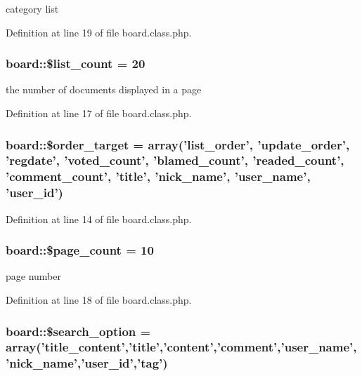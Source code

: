 category list 



Definition at line 19 of file board.\-class.\-php.

\hypertarget{classboard_ab66c6932a082c110ebd921c0be8d6788}{
\subsubsection[{\$list\-\_\-count}]{\setlength{\rightskip}{0pt plus 5cm}board\-::\$list\-\_\-count = 20}}\label{classboard_ab66c6932a082c110ebd921c0be8d6788}


the number of documents displayed in a page 



Definition at line 17 of file board.\-class.\-php.

\hypertarget{classboard_a66d1965fe6a51e8143499adeaf3998cc}{
\subsubsection[{\$order\-\_\-target}]{\setlength{\rightskip}{0pt plus 5cm}board\-::\$order\-\_\-target = array('list\-\_\-order', 'update\-\_\-order', 'regdate', 'voted\-\_\-count', 'blamed\-\_\-count', 'readed\-\_\-count', 'comment\-\_\-count', '{\bf title}', '{\bf nick\-\_\-name}', '{\bf user\-\_\-name}', '{\bf user\-\_\-id}')}}\label{classboard_a66d1965fe6a51e8143499adeaf3998cc}


Definition at line 14 of file board.\-class.\-php.

\hypertarget{classboard_ab5d2d3925f753039483da2c65076122b}{
\subsubsection[{\$page\-\_\-count}]{\setlength{\rightskip}{0pt plus 5cm}board\-::\$page\-\_\-count = 10}}\label{classboard_ab5d2d3925f753039483da2c65076122b}


page number 



Definition at line 18 of file board.\-class.\-php.

\hypertarget{classboard_a6affe0c86966ebd06572cc4c8abde32b}{
\subsubsection[{\$search\-\_\-option}]{\setlength{\rightskip}{0pt plus 5cm}board\-::\$search\-\_\-option = array('title\-\_\-content','{\bf title}','{\bf content}','{\bf comment}','{\bf user\-\_\-name}','{\bf nick\-\_\-name}','{\bf user\-\_\-id}','{\bf tag}')}}\label{classboard_a6affe0c86966ebd06572cc4c8abde32b}


